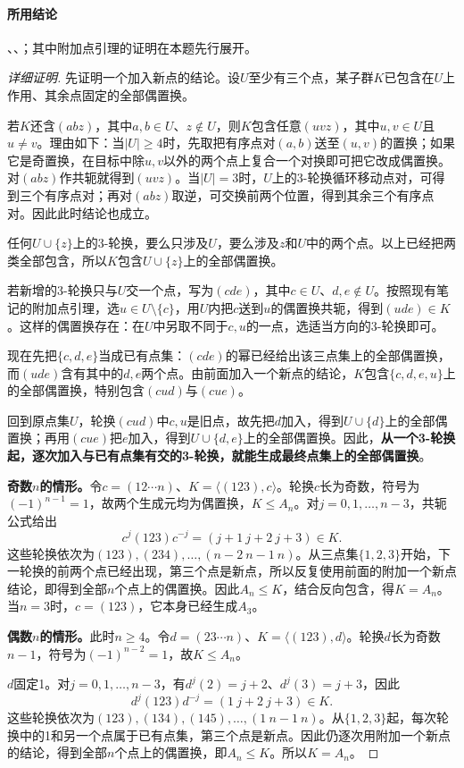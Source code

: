 \paragraph{所用结论}、、；其中附加点引理的证明在本题先行展开。
\begin{proof}[详细证明]
先证明一个加入新点的结论。设$U$至少有三个点，某子群$K$已包含在$U$上作用、其余点固定的全部偶置换。

若$K$还含$(abz)$，其中$a,b\in U$、$z\notin U$，则$K$包含任意$(uvz)$，其中$u,v\in U$且$u\ne v$。理由如下：当$|U|\ge4$时，先取把有序点对$(a,b)$送至$(u,v)$的置换；如果它是奇置换，在目标中除$u,v$以外的两个点上复合一个对换即可把它改成偶置换。对$(abz)$作共轭就得到$(uvz)$。当$|U|=3$时，$U$上的3-轮换循环移动点对，可得到三个有序点对；再对$(abz)$取逆，可交换前两个位置，得到其余三个有序点对。因此此时结论也成立。

任何$U\cup\{z\}$上的3-轮换，要么只涉及$U$，要么涉及$z$和$U$中的两个点。以上已经把两类全部包含，所以$K$包含$U\cup\{z\}$上的全部偶置换。

若新增的3-轮换只与$U$交一个点，写为$(cde)$，其中$c\in U$、$d,e\notin U$。按照现有笔记的附加点引理，选$u\in U\setminus\{c\}$，用$U$内把$c$送到$u$的偶置换共轭，得到$(ude)\in K$。这样的偶置换存在：在$U$中另取不同于$c,u$的一点，选适当方向的3-轮换即可。

现在先把$\{c,d,e\}$当成已有点集：$(cde)$的幂已经给出该三点集上的全部偶置换，而$(ude)$含有其中的$d,e$两个点。由前面加入一个新点的结论，$K$包含$\{c,d,e,u\}$上的全部偶置换，特别包含$(cud)$与$(cue)$。

回到原点集$U$，轮换$(cud)$中$c,u$是旧点，故先把$d$加入，得到$U\cup\{d\}$上的全部偶置换；再用$(cue)$把$e$加入，得到$U\cup\{d,e\}$上的全部偶置换。因此，\textbf{从一个3-轮换起，逐次加入与已有点集有交的3-轮换，就能生成最终点集上的全部偶置换}。

\textbf{奇数$n$的情形。}令$c=(12\cdots n)$、$K=\langle(123),c\rangle$。轮换$c$长为奇数，符号为$(-1)^{n-1}=1$，故两个生成元均为偶置换，$K\le A_n$。对$j=0,1,\ldots,n-3$，共轭公式给出
\[
c^j(123)c^{-j}=(j+1\ j+2\ j+3)\in K.
\]
这些轮换依次为$(123),(234),\ldots,(n-2\ n-1\ n)$。从三点集$\{1,2,3\}$开始，下一轮换的前两个点已经出现，第三个点是新点，所以反复使用前面的附加一个新点结论，即得到全部$n$个点上的偶置换。因此$A_n\le K$，结合反向包含，得$K=A_n$。当$n=3$时，$c=(123)$，它本身已经生成$A_3$。

\textbf{偶数$n$的情形。}此时$n\ge4$。令$d=(23\cdots n)$、$K=\langle(123),d\rangle$。轮换$d$长为奇数$n-1$，符号为$(-1)^{n-2}=1$，故$K\le A_n$。

$d$固定1。对$j=0,1,\ldots,n-3$，有$d^j(2)=j+2$、$d^j(3)=j+3$，因此
\[
d^j(123)d^{-j}=(1\ j+2\ j+3)\in K.
\]
这些轮换依次为$(123),(134),(145),\ldots,(1\ n-1\ n)$。从$\{1,2,3\}$起，每次轮换中的1和另一个点属于已有点集，第三个点是新点。因此仍逐次用附加一个新点的结论，得到全部$n$个点上的偶置换，即$A_n\le K$。所以$K=A_n$。
\end{proof}
